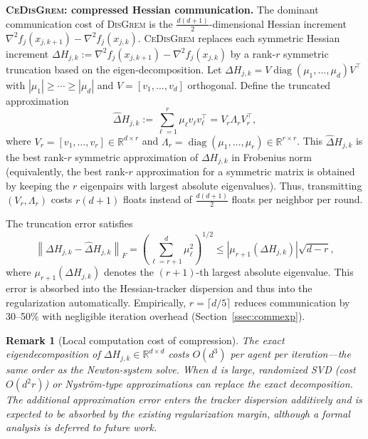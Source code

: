 \documentclass[11pt,a4paper]{article}
\def\cO{O}%
\newtheorem{remark}[theorem]{Remark}
\newcommand{\R}{\mathbb{R}}
\newcommand{\normF}[1]{\left\|#1\right\|_F}
\newcommand{\cO}{\mathcal{O}}
\begin{document}
\noindent\textbf{\textsc{CeDisGrem}: compressed Hessian communication.}
The dominant communication cost of \textsc{DisGrem} is the $\frac{d(d+1)}{2}$-dimensional
Hessian increment $\nabla^2 f_j(x_{j,k+1})-\nabla^2 f_j(x_{j,k})$.
\textsc{CeDisGrem} replaces each symmetric Hessian increment
$\Delta H_{j,k}:=\nabla^2 f_j(x_{j,k+1})-\nabla^2 f_j(x_{j,k})$
by a rank-$r$ symmetric truncation based on the eigen-decomposition.
Let $\Delta H_{j,k}=V\operatorname{diag}(\mu_1,\dots,\mu_d)V^\top$ with
$|\mu_1|\ge \cdots \ge |\mu_d|$ and $V=[v_1,\dots,v_d]$ orthogonal.
Define the truncated approximation
\[
\hat\Delta H_{j,k}:=\sum_{\ell=1}^r \mu_\ell v_\ell v_\ell^\top
= V_r\Lambda_r V_r^\top,
\]
where $V_r=[v_1,\dots,v_r]\in\R^{d\times r}$ and $\Lambda_r=\operatorname{diag}(\mu_1,\dots,\mu_r)\in\R^{r\times r}$.
This $\hat\Delta H_{j,k}$ is the best rank-$r$ symmetric approximation of $\Delta H_{j,k}$ in Frobenius norm
(equivalently, the best rank-$r$ approximation for a symmetric matrix is obtained by keeping the $r$
eigenpairs with largest absolute eigenvalues).
Thus, transmitting $(V_r,\Lambda_r)$ costs $r(d+1)$ floats instead of $\frac{d(d+1)}{2}$ floats per neighbor per round.

The truncation error satisfies
\[
\normF{\Delta H_{j,k}-\hat\Delta H_{j,k}}
=\left(\sum_{\ell=r+1}^d \mu_\ell^2\right)^{1/2}
\le |\mu_{r+1}(\Delta H_{j,k})|\sqrt{d-r},
\]
where $\mu_{r+1}(\Delta H_{j,k})$ denotes the $(r+1)$-th largest absolute eigenvalue.
This error is absorbed into the Hessian-tracker dispersion and thus into the regularization automatically.
Empirically, $r=\lceil d/5\rceil$ reduces communication by 30--50\% with negligible iteration overhead
(Section~\ref{ssec:commexp}).

\begin{remark}[Local computation cost of compression]
The exact eigendecomposition of $\Delta H_{j,k}\in\R^{d\times d}$
costs $\cO(d^3)$ per agent per iteration---the same order as the
Newton-system solve.
When $d$ is large, randomized SVD
(cost $\cO(d^2 r)$) or Nystr\"om-type approximations can replace
the exact decomposition.
The additional approximation error enters the tracker dispersion
additively and is expected to be absorbed by the existing
regularization margin, although a formal analysis is deferred to
future work.
\end{remark}
	
\end{document}
